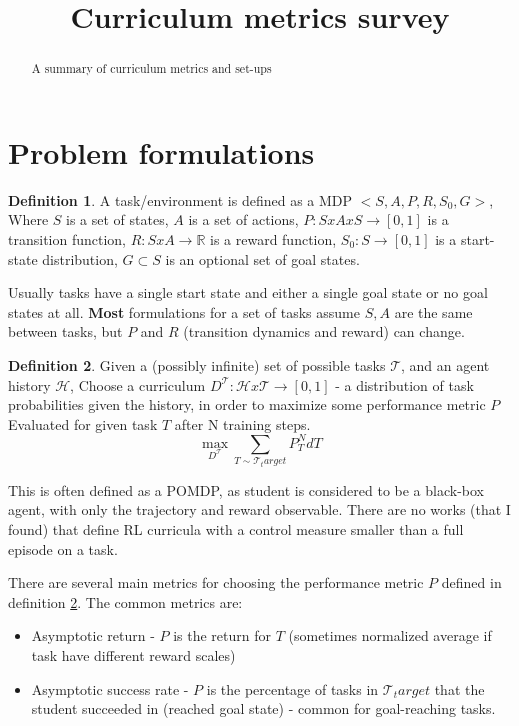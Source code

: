 \documentclass[letterpaper]{article}
\title{Curriculum metrics survey}
\theoremstyle{definition}
\newtheorem{defn}{Definition}[section]
\begin{document}
	\maketitle
	\begin{abstract}
		A summary of curriculum metrics and set-ups
	\end{abstract}

\section{Problem formulations} \label{sec:formulation}
\begin{defn}
	A task/environment is defined as a MDP $<S,A,P,R,S_0,G>$,
	Where $S$ is a set of states, $A$ is a set of actions, $P:SxAxS\rightarrow [0,1]$ is a transition function, 
	$R:SxA\rightarrow \mathbb{R}$ is a reward function, $S_0:S\rightarrow [0,1]$ is a start-state distribution,
	$G\subset S$ is an optional set of goal states.
\end{defn}

Usually tasks have a single start state and either a single goal state or no goal states at all.
\textbf{Most} formulations for a set of tasks assume $S,A$ are the same between tasks, but $P$ and $R$ (transition dynamics and reward) can change.

\begin{defn} \label{defn:curriculum}
	Given a (possibly infinite) set of possible tasks $\mathcal{T}$, and an agent history $\mathcal{H}$, 
	Choose a curriculum $D^{\mathcal{T}}: \mathcal{H}x\mathcal{T}\rightarrow [0,1]$ - a distribution of task probabilities given the history,
	in order to maximize some performance metric $P$ Evaluated for given task $T$ after N training steps.
	\[
	\max_{D^{\mathcal{T}}} \sum_{T \sim \mathcal{T}_target} {P_T^N dT}
	\]

\end{defn}
This is often defined as a POMDP, as student is considered to be a black-box agent, with only the trajectory and reward observable.
There are no works (that I found) that define RL curricula with a control measure smaller than a full episode on a task.

There are several main metrics for choosing the performance metric $P$ defined in definition \ref{defn:curriculum}.
The common metrics are:
\begin{itemize}
	\item Asymptotic return - $P$ is the return for $T$ (sometimes normalized average if task have different reward scales)
	\item Asymptotic success rate - $P$ is the percentage of tasks in $\mathcal{T}_target$ that the student succeeded in (reached goal state) - common for goal-reaching tasks.
\end{itemize}
\end{document}
